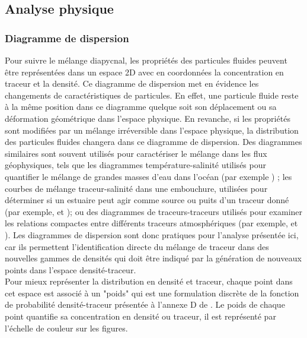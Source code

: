 \documentclass[a4paper,12pt]{article}
\begin{document}
    \subsection{Analyse physique}
    
        \subsubsection{Diagramme de dispersion}
        
        Pour suivre le mélange diapycnal, les propriétés des particules fluides peuvent être représentées dans un espace 2D avec en coordonnées la concentration en traceur et la densité. 
        Ce diagramme de dispersion met en évidence les changements de caractéristiques de particules. En effet, une particule fluide reste à la même position dans ce diagramme quelque soit son déplacement ou sa déformation géométrique dans l'espace physique. En revanche, si les propriétés sont modifiées par un mélange irréversible dans l'espace physique, la distribution des particules fluides changera dans ce diagramme de dispersion. 
        Des diagrammes similaires sont souvent utilisés pour caractériser le mélange dans les flux géophysiques, tels que les diagrammes température-salinité utilisés pour quantifier le mélange de grandes masses d'eau dans l'océan (par exemple \citep{tomczak_multi-parameter_1981}) ; les courbes de mélange traceur-salinité dans une embouchure, utilisées pour déterminer si un estuaire peut agir comme source ou puits d'un traceur donné (par exemple, \citep{loder_dynamics_1981} et \cite{officer_dynamics_1981}); ou des diagrammes de traceurs-traceurs utilisés pour examiner les relations compactes entre différents traceurs atmosphériques (par exemple, \cite{tilmes_development_2006} et \cite{plumb_tracer_2007}). Les diagrammes de dispersion sont donc pratiques pour l'analyse présentée ici, car ils permettent l'identification directe du mélange de traceur dans des nouvelles gammes de densités
        qui doit être indiqué par la génération de nouveaux points dans l'espace densité-traceur.\\
        Pour mieux représenter la distribution en densité et traceur, chaque point dans cet espace est associé à un "poids" qui est une formulation discrète de la fonction de probabilité densité-traceur présentée à l'annexe D de \cite{plumb_tracer_2007}. Le poids de chaque point quantifie sa concentration en densité ou traceur, il est représenté par l'échelle de couleur sur les figures. \\
\end{document}

